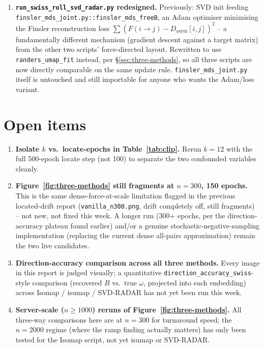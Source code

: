 \documentclass[11pt]{article}
\begin{document}
\begin{enumerate}
\item \textbf{\texttt{run\_swiss\_roll\_svd\_radar.py} redesigned.} Previously: SVD init feeding
\texttt{finsler\_mds\_joint.py::finsler\_mds\_freeB}, an Adam optimiser minimising the Finsler
reconstruction loss $\sum(F(i\to j)-D_{\mathrm{asym}}[i,j])^2$ -- a fundamentally different
mechanism (gradient descent against a target matrix) from the other two scripts' force-directed
layout. Rewritten to use \texttt{randers\_umap\_fit} instead, per \S\ref{sec:three-methods}, so all
three scripts are now directly comparable on the same update rule.
\texttt{finsler\_mds\_joint.py} itself is untouched and still importable for anyone who wants the
Adam/loss variant.
\end{enumerate}

\section{Open items}
\label{sec:next}

\begin{enumerate}
\item \textbf{Isolate $k$ vs.\ locate-epochs in Table~\ref{tab:clip}.} Rerun $k=12$ with the full
500-epoch locate step (not 100) to separate the two confounded variables cleanly.
\item \textbf{Figure~\ref{fig:three-methods} still fragments at $n=300$, 150 epochs.} This is the
same dense-force-at-scale limitation flagged in the previous located-drift report
(\texttt{vanilla\_n300.png}, drift completely off, still fragments) -- not new, not fixed this
week. A longer run (300+ epochs, per the direction-accuracy plateau found earlier) and/or a genuine
stochastic-negative-sampling implementation (replacing the current dense all-pairs approximation)
remain the two live candidates.
\item \textbf{Direction-accuracy comparison across all three methods.} Every image in this report is
judged visually; a quantitative \texttt{direction\_accuracy\_swiss}-style comparison (recovered
$B$ vs.\ true $\omega$, projected into each embedding) across Isomap / isumap / SVD-RADAR has not
yet been run this week.
\item \textbf{Server-scale ($n\ge1000$) reruns of Figure~\ref{fig:three-methods}.} All three-way
comparisons here are at $n=300$ for turnaround speed; the $n=2000$ regime (where the ramp finding
actually matters) has only been tested for the Isomap script, not yet isumap or SVD-RADAR.
\end{enumerate}
\end{document}

